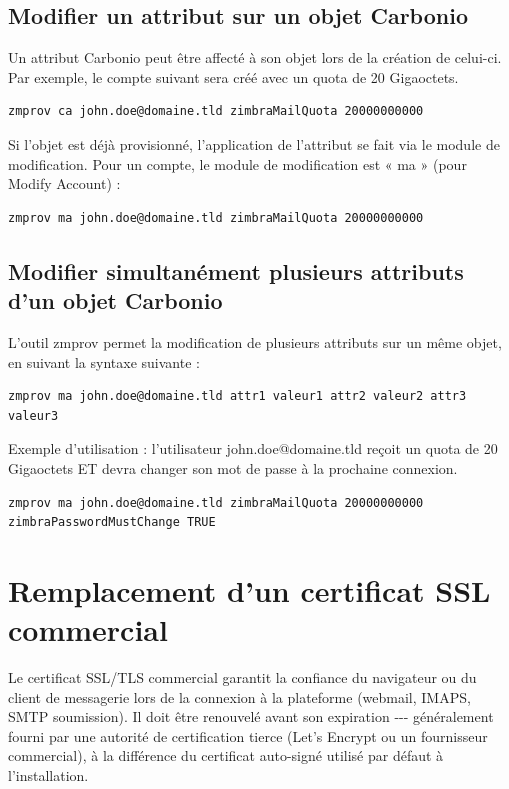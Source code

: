 \documentclass[11pt,a4paper]{report}
\begin{document}
\section{Modifier un attribut sur un objet Carbonio}
Un attribut Carbonio peut être affecté à son objet lors de la création de celui-\allowbreak{}ci.\allowbreak{}
Par exemple, le compte suivant sera créé avec un quota de 20 Gigaoctets.\allowbreak{}


\begin{lstlisting}
zmprov ca john.doe@domaine.tld zimbraMailQuota 20000000000
\end{lstlisting}
Si l'objet est déjà provisionné, l'application de l'attribut se fait via le module
de modification.\allowbreak{} Pour un compte, le module de modification est « ma » (pour Modify
Account) :


\begin{lstlisting}
zmprov ma john.doe@domaine.tld zimbraMailQuota 20000000000

\end{lstlisting}


\section{Modifier simultanément plusieurs attributs d'un objet Carbonio}
L'outil zmprov permet la modification de plusieurs attributs sur un même objet, en suivant la syntaxe suivante :

\begin{lstlisting}
zmprov ma john.doe@domaine.tld attr1 valeur1 attr2 valeur2 attr3 valeur3
\end{lstlisting}
Exemple d'utilisation : l'utilisateur john.\allowbreak{}doe@domaine.\allowbreak{}tld reçoit un quota de
20 Gigaoctets ET devra changer son mot de passe à la prochaine connexion.\allowbreak{}


\begin{lstlisting}
zmprov ma john.doe@domaine.tld zimbraMailQuota 20000000000 zimbraPasswordMustChange TRUE

\end{lstlisting}


\chapter{Remplacement d'un certificat SSL commercial}

Le certificat SSL/TLS commercial garantit la confiance du navigateur ou
du client de messagerie lors de la connexion à la plateforme (webmail,
IMAPS, SMTP soumission).\allowbreak{} Il doit être renouvelé avant son expiration
-\allowbreak{}-\allowbreak{}-\allowbreak{} généralement fourni par une autorité de certification tierce
(Let's Encrypt ou un fournisseur commercial), à la différence du
certificat auto-\allowbreak{}signé utilisé par défaut à l'installation.\allowbreak{}
\end{document}
